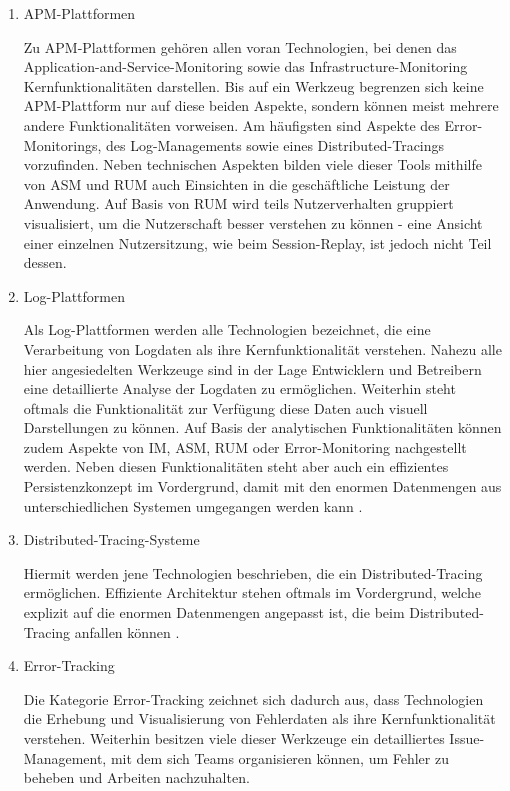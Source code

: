 \begin{enumerate}
	\item APM-Plattformen
	\par Zu APM-Plattformen gehören allen voran Technologien, bei denen das Application-and-Service-Monitoring sowie das Infrastructure-Monitoring Kernfunktionalitäten darstellen. Bis auf ein Werkzeug begrenzen sich keine APM-Plattform nur auf diese beiden Aspekte, sondern können meist mehrere andere Funktionalitäten vorweisen. Am häufigsten sind Aspekte des Error-Monitorings, des Log-Managements sowie eines Distributed-Tracings vorzufinden. Neben technischen Aspekten bilden viele dieser Tools mithilfe von ASM und RUM auch Einsichten in die geschäftliche Leistung der Anwendung. Auf Basis von RUM wird teils Nutzerverhalten gruppiert visualisiert, um die Nutzerschaft besser verstehen zu können - eine Ansicht einer einzelnen Nutzersitzung, wie beim Session-Replay, ist jedoch nicht Teil dessen.
	
	\item Log-Plattformen
	\par Als Log-Plattformen werden alle Technologien bezeichnet, die eine Verarbeitung von Logdaten als ihre Kernfunktionalität verstehen. Nahezu alle hier angesiedelten Werkzeuge sind in der Lage Entwicklern und Betreibern eine detaillierte Analyse der Logdaten zu ermöglichen. Weiterhin steht oftmals die Funktionalität zur Verfügung diese Daten auch visuell Darstellungen zu können. Auf Basis der analytischen Funktionalitäten können zudem Aspekte von IM, ASM, RUM oder Error-Monitoring nachgestellt werden. Neben diesen Funktionalitäten steht aber auch ein effizientes Persistenzkonzept im Vordergrund, damit mit den enormen Datenmengen aus unterschiedlichen Systemen umgegangen werden kann \cite{TowardsAutomatedLogParsingForLargeScale}.
	
	\item Distributed-Tracing-Systeme
	\par Hiermit werden jene Technologien beschrieben, die ein Distributed-Tracing ermöglichen. Effiziente Architektur stehen oftmals im Vordergrund, welche explizit auf die enormen Datenmengen angepasst ist, die beim Distributed-Tracing anfallen können \cite{DapperInfrastructure}.
	
	\item Error-Tracking
	\par Die Kategorie Error-Tracking zeichnet sich dadurch aus, dass Technologien die Erhebung und Visualisierung von Fehlerdaten als ihre Kernfunktionalität verstehen. Weiterhin besitzen viele dieser Werkzeuge ein detailliertes Issue-Management, mit dem sich Teams organisieren können, um Fehler zu beheben und Arbeiten nachzuhalten.
	

\end{enumerate}
